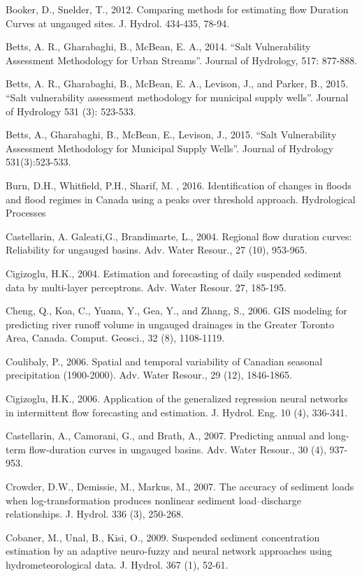 \begin{hangingpar}{2em}
Booker, D., Snelder, T., 2012. Comparing methods for estimating flow Duration Curves at ungauged sites. J. Hydrol. 434-435, 78-94. 

Betts, A. R., Gharabaghi, B., McBean, E. A., 2014.  ``Salt Vulnerability Assessment Methodology for Urban Streams''.   Journal of Hydrology, 517: 877-888.

Betts, A. R., Gharabaghi, B., McBean, E. A., Levison, J., and Parker, B., 2015. ``Salt vulnerability assessment methodology for municipal supply wells''. Journal of Hydrology 531 (3): 523-533.

Betts, A., Gharabaghi, B., McBean, E., Levison, J., 2015.  ``Salt Vulnerability Assessment Methodology for Municipal Supply Wells''.  Journal of Hydrology 531(3):523-533.

Burn, D.H., Whitfield, P.H., Sharif, M. , 2016. Identification of changes in floods and flood regimes in Canada using a peaks over threshold approach. Hydrological Processes

Castellarin, A. Galeati,G., Brandimarte, L., 2004. Regional flow duration curves: Reliability for ungauged basins. Adv. Water Resour., 27 (10), 953-965. 

Cigizoglu, H.K., 2004. Estimation and forecasting of daily suspended sediment data by multi-layer perceptrons. Adv. Water Resour. 27, 185-195.

Cheng, Q., Koa, C., Yuana, Y., Gea, Y., and Zhang, S., 2006. GIS modeling for predicting river runoff volume in ungauged drainages in the Greater Toronto Area, Canada. Comput. Geosci., 32 (8), 1108-1119.

Coulibaly, P., 2006. Spatial and temporal variability of Canadian seasonal precipitation (1900-2000). Adv. Water Resour., 29 (12), 1846-1865.

Cigizoglu, H.K., 2006. Application of the generalized regression neural networks in intermittent flow forecasting and estimation. J. Hydrol. Eng. 10 (4), 336-341.

Castellarin, A., Camorani, G., and Brath, A., 2007. Predicting annual and long-term flow-duration curves in ungauged basins. Adv. Water Resour., 30 (4), 937-953.

Crowder, D.W., Demissie, M., Markus, M., 2007. The accuracy of sediment loads when log-transformation produces nonlinear sediment load–discharge relationships. J. Hydrol. 336 (3), 250-268.

Cobaner, M., Unal, B., Kisi, O., 2009. Suspended sediment concentration estimation by an adaptive neuro-fuzzy and neural network approaches using hydrometeorological data. J. Hydrol. 367 (1), 52-61.


\end{hangingpar}
